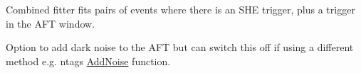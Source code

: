 Combined fitter fits pairs of events where there is an SHE trigger, plus a trigger in the AFT window.

Option to add dark noise to the AFT but can switch this off if using a different method e.\+g. ntag\textquotesingle{}s \mbox{\hyperlink{classAddNoise}{Add\+Noise}} function. 
